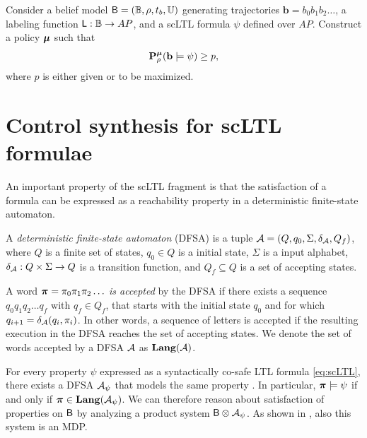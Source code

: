 \documentclass{ifacconf}
\begin{document}
\begin{problem}
\label{prob:main}
  Consider a belief model $\mathsf{B} = (\mathbb{B}, \rho, t_b, {\mathbb{U}})$ generating trajectories $\mathbf{b} = b_0 b_1 b_2 \ldots$, a labeling function $\mathsf{L} : \mathbb{B} \rightarrow AP$, and a scLTL formula $\psi$ defined over $AP$. Construct a policy ${\boldsymbol{\mu}}$ such that
  \begin{equation}
    \mathbf{P}_\rho^{\boldsymbol{\mu}} ( \mathbf{b} \models \psi )\geq p,
  \end{equation}
  where $p$ is either given or to be maximized.
\end{problem}


\section{Control synthesis for scLTL formulae}
\label{sec:exact_synth}

An important property of the scLTL fragment is that the satisfaction of a formula can be expressed as a reachability property in a deterministic finite-state automaton.

\begin{definition}
  A \emph{deterministic finite-state automaton} (DFSA) is a tuple $\mathcal{A} = (Q, q_0, \Sigma, \delta_{\mathcal{A}}, Q_f)$, where $Q$ is a finite set of states, $q_0 \in Q$ is a initial state, $\Sigma$ is a input alphabet, $\delta_{\mathcal{A}} : Q \times \Sigma \rightarrow Q$ is a transition function, and $Q_f\subseteq Q$ is a set of accepting states.

  A word ${\boldsymbol{\pi}} = \pi_0 \pi_1 \pi_2 \ldots$ \emph{is accepted} by the DFSA if there exists a sequence $q_0 q_1 q_2 \ldots q_f$ with $q_f\in Q_f$, that starts with the initial state $q_0$ and for which $q_{i+1}=\delta_{\mathcal{A}}(q_i,\pi_i)$. In other words, a sequence of letters is accepted if the resulting execution in the DFSA reaches the set of accepting states. We denote the set of words accepted by a DFSA $\mathcal{A}$ as $\mathbf{Lang} (\mathcal A)$.
\end{definition}

For every property $\psi$ expressed as a syntactically co-safe LTL formula \eqref{eq:scLTL}, there exists a DFSA  $\mathcal{A}_\psi$ that models the same property \citep{Belta2017}. In particular, ${\boldsymbol{\pi}}\models\psi$ if and only if ${\boldsymbol{\pi}}\in \mathbf{Lang}(\mathcal{A}_\psi)$. We can therefore reason about satisfaction of properties on $\mathsf{B}$ by analyzing a product system $\mathsf{B} \otimes \mathcal{A}_\psi$. As shown in \citep{tmka2013}, also this system is an MDP.
\end{document}
